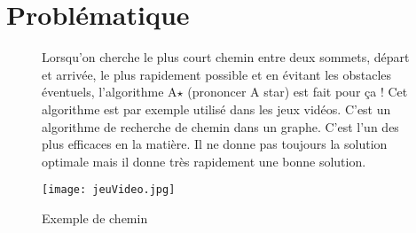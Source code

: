 \def\xxactivite{Cours}

\def\xxauteur{P. Bessonnat -- Xavier Pessoles}
\fichefalse \proftrue \tdfalse \courstrue

\def\xxnumchapitre{Chapitre 14 \vspace{.2cm}}

\def\xxchapitre{Algorithme A$\star$}

\def\xxcompetences{%
}

\def\xxfigures{
}%



\setlength{\columnseprule}{.1pt}

\vspace{2cm}
\pagestyle{fancy}
\thispagestyle{plain}


\section{Problématique}




\begin{figure}[!h]
\begin{minipage}{0.6\textwidth}
Lorsqu'on cherche le plus court chemin entre deux sommets, départ et arrivée, le plus rapidement possible et en évitant les obstacles éventuels, l'algorithme A$\star$ (prononcer A star) est fait pour ça ! Cet algorithme est par exemple utilisé dans les jeux vidéos.
C'est un algorithme de recherche de chemin dans un graphe. C'est l'un des plus efficaces en la matière. Il ne donne pas toujours la solution optimale mais il donne très rapidement une bonne solution.\\
\end{minipage}
\begin{minipage}{0.4\textwidth}
\begin{center}
\texttt{[image: jeuVideo.jpg]}
\caption{Exemple de chemin}
\end{center}
\end{minipage}
\end{figure}


